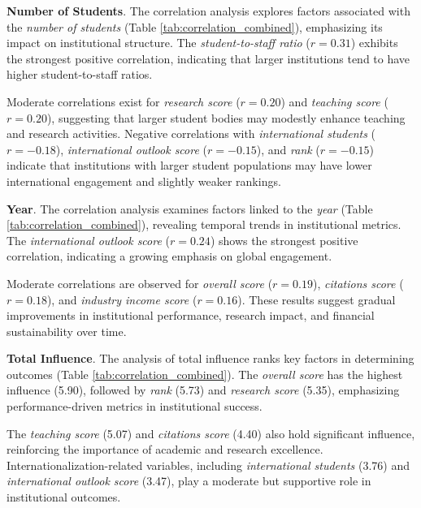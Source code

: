 \documentclass[conference]{IEEEtran}
\begin{document}
\textbf{Number of Students}. The correlation analysis explores factors associated with the \textit{number of students} (Table \ref{tab:correlation_combined}), emphasizing its impact on institutional structure. The \textit{student-to-staff ratio} ($r = 0.31$) exhibits the strongest positive correlation, indicating that larger institutions tend to have higher student-to-staff ratios.

Moderate correlations exist for \textit{research score} ($r = 0.20$) and \textit{teaching score} ($r = 0.20$), suggesting that larger student bodies may modestly enhance teaching and research activities. Negative correlations with \textit{international students} ($r = -0.18$), \textit{international outlook score} ($r = -0.15$), and \textit{rank} ($r = -0.15$) indicate that institutions with larger student populations may have lower international engagement and slightly weaker rankings.



\textbf{Year}. The correlation analysis examines factors linked to the \textit{year} (Table \ref{tab:correlation_combined}), revealing temporal trends in institutional metrics. The \textit{international outlook score} ($r = 0.24$) shows the strongest positive correlation, indicating a growing emphasis on global engagement.

Moderate correlations are observed for \textit{overall score} ($r = 0.19$), \textit{citations score} ($r = 0.18$), and \textit{industry income score} ($r = 0.16$). These results suggest gradual improvements in institutional performance, research impact, and financial sustainability over time.

\textbf{Total Influence}. The analysis of total influence ranks key factors in determining outcomes (Table \ref{tab:correlation_combined}). The \textit{overall score} has the highest influence (5.90), followed by \textit{rank} (5.73) and \textit{research score} (5.35), emphasizing performance-driven metrics in institutional success.

The \textit{teaching score} (5.07) and \textit{citations score} (4.40) also hold significant influence, reinforcing the importance of academic and research excellence. Internationalization-related variables, including \textit{international students} (3.76) and \textit{international outlook score} (3.47), play a moderate but supportive role in institutional outcomes.
\end{document}
